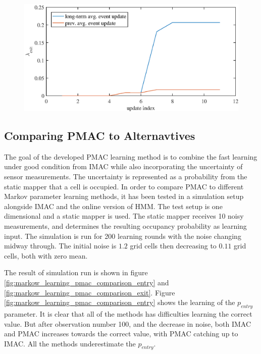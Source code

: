 \begin{figure}[htbp]
    \centering
    \includegraphics[scale=1]{chapters/mapping_of_dynamic_areas/figures/visualization_of_advantage_long_term_average}
    \caption{}
    \label{fig:visualization_of_advantage_long_term_average}
\end{figure}


\subsection{Comparing PMAC to Alternavtives}
The goal of the developed PMAC learning method is to combine the fast learning under good condition from IMAC while also incorporating the uncertainty of sensor measurements. The uncertainty is represented as a probability from the static mapper that a cell is occupied. In order to compare PMAC to different Markov parameter learning methods, it has been tested in a simulation setup alongside IMAC and the online version of HMM. The test setup is one dimensional and a static mapper is used. The static mapper receives 10 noisy measurements, and determines the resulting occupancy probability as learning input. The simulation is run for 200 learning rounds with the noise changing midway through. The initial noise is \(1.2\) grid cells then decreasing to \(0.11\) grid cells, both with zero mean. 

The result of simulation run is shown in figure \ref{fig:markow_learning_pmac_comparison_entry} and \ref{fig:markow_learning_pmac_comparison_exit}. Figure  \ref{fig:markow_learning_pmac_comparison_entry} shows the learning of the \(p_{entry}\) parameter. It is clear that all of the methods has difficulties learning the correct value. But after observation number 100, and the decrease in noise, both IMAC and PMAC increases towards the correct value, with PMAC catching up to IMAC. All the methods underestimate the \(p_{entry}\).

